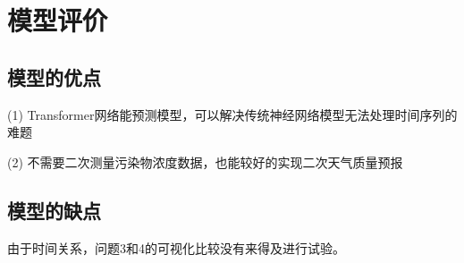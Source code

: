 \documentclass[a4paper,10pt]{my_paper}
\numberwithin{equation}{section}
\begin{document}
\section{模型评价}
\subsection{模型的优点}
(1) Transformer网络能预测模型，可以解决传统神经网络模型无法处理时间序列的难题

(2) 不需要二次测量污染物浓度数据，也能较好的实现二次天气质量预报
\subsection{模型的缺点}
由于时间关系，问题3和4的可视化比较没有来得及进行试验。
\end{document}
